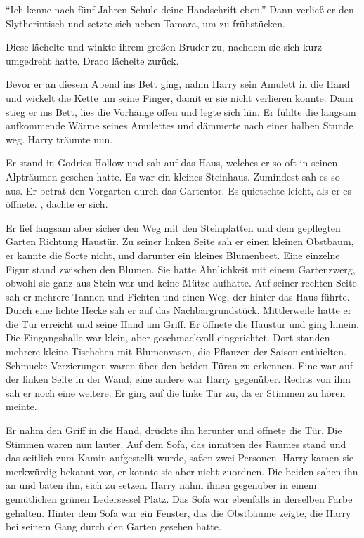 \enquote{Ich kenne nach fünf Jahren Schule deine Handschrift eben.} Dann verließ er den Slytherintisch und setzte sich neben Tamara, um zu frühstücken.

Diese lächelte und winkte ihrem großen Bruder zu, nachdem sie sich kurz umgedreht hatte. Draco lächelte zurück.

\trenn

Bevor er an diesem Abend ins Bett ging, nahm Harry sein Amulett in die Hand und wickelt die Kette um seine Finger, damit er sie nicht verlieren konnte. Dann stieg er ins Bett, lies die Vorhänge offen und legte sich hin. Er fühlte die langsam aufkommende Wärme seines Amulettes und dämmerte nach einer halben Stunde weg. Harry träumte nun.

\begin{traum}
Er stand in Godrics Hollow und sah auf das Haus, welches er so oft in seinen Alpträumen gesehen hatte. Es war ein kleines Steinhaus. Zumindest sah es so aus. Er betrat den Vorgarten durch das Gartentor. Es quietschte leicht, als er es öffnete. , dachte er sich.

Er lief langsam aber sicher den Weg mit den Steinplatten und dem gepflegten Garten Richtung Haustür. Zu seiner linken Seite sah er einen kleinen Obstbaum, er kannte die Sorte nicht, und darunter ein kleines Blumenbeet. Eine einzelne Figur stand zwischen den Blumen. Sie hatte Ähnlichkeit mit einem Gartenzwerg, obwohl sie ganz aus Stein war und keine Mütze aufhatte. Auf seiner rechten Seite sah er mehrere Tannen und Fichten und einen Weg, der hinter das Haus führte. Durch eine lichte Hecke sah er auf das Nachbargrundstück. Mittlerweile hatte er die Tür erreicht und seine Hand am Griff. Er öffnete die Haustür und ging hinein. Die Eingangshalle war klein, aber geschmackvoll eingerichtet. Dort standen mehrere kleine Tischchen mit Blumenvasen, die Pflanzen der Saison enthielten. Schmucke Verzierungen waren über den beiden Türen zu erkennen. Eine war auf der linken Seite in der Wand, eine andere war Harry gegenüber. Rechts von ihm sah er noch eine weitere. Er ging auf die linke Tür zu, da er Stimmen zu hören meinte.

Er nahm den Griff in die Hand, drückte ihn herunter und öffnete die Tür. Die Stimmen waren nun lauter. Auf dem Sofa, das inmitten des Raumes stand und das seitlich zum Kamin aufgestellt wurde, saßen zwei Personen. Harry kamen sie merkwürdig bekannt vor, er konnte sie aber nicht zuordnen. Die beiden sahen ihn an und baten ihn, sich zu setzen. Harry nahm ihnen gegenüber in einem gemütlichen grünen Ledersessel Platz. Das Sofa war ebenfalls in derselben Farbe gehalten. Hinter dem Sofa war ein Fenster, das die Obstbäume zeigte, die Harry bei seinem Gang durch den Garten gesehen hatte.


\end{traum}
